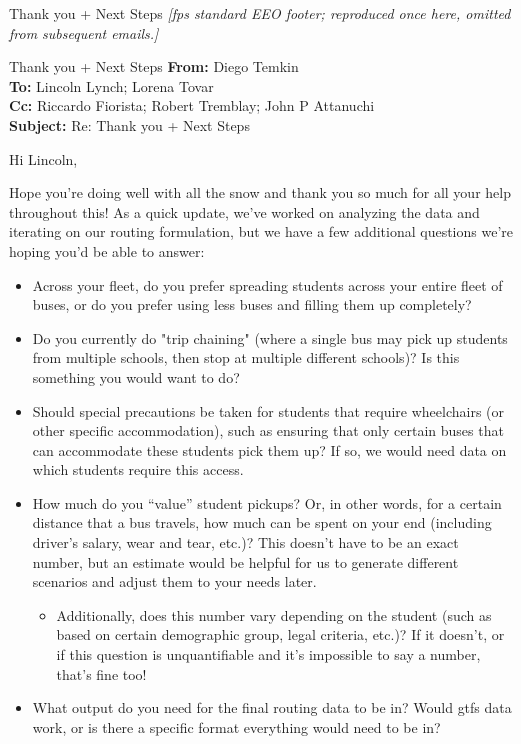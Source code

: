 {\begin{emailbox}{Thank you + Next Steps}
    \textit{[\gls{fps} standard EEO footer; reproduced once here, omitted from subsequent emails.]}
\end{emailbox}

\begin{emailbox}{Thank you + Next Steps}
    \textbf{From:} Diego Temkin \\
    \textbf{To:} Lincoln Lynch; Lorena Tovar \\
    \textbf{Cc:} Riccardo Fiorista; Robert Tremblay; John P Attanuchi \\
    \textbf{Subject:} Re: Thank you + Next Steps

    \vspace{1em}
    Hi Lincoln, \vspace{1em}

    Hope you're doing well with all the snow and thank you so much for all your help throughout this! As a quick update, we've worked on analyzing the data and iterating on our routing formulation, but we have a few additional questions we're hoping you'd be able to answer:

    \begin{itemize}
        \item Across your fleet, do you prefer spreading students across your entire fleet of buses, or do you prefer using less buses and filling them up completely?
        \item Do you currently do "trip chaining" (where a single bus may pick up students from multiple schools, then stop at multiple different schools)? Is this something you would want to do?
        \item Should special precautions be taken for students that require wheelchairs (or other specific accommodation), such as ensuring that only certain buses that can accommodate these students pick them up? If so, we would need data on which students require this access.
        \item How much do you ``value'' student pickups? Or, in other words, for a certain distance that a bus travels, how much can be spent on your end (including driver's salary, wear and tear, etc.)? This doesn't have to be an exact number, but an estimate would be helpful for us to generate different scenarios and adjust them to your needs later.
        \begin{itemize}
            \item Additionally, does this number vary depending on the student (such as based on certain demographic group, legal criteria, etc.)? If it doesn't, or if this question is unquantifiable and it's impossible to say a number, that's fine too!
        \end{itemize}
        \item What output do you need for the final routing data to be in? Would \acrshort{gtfs} data work, or is there a specific format everything would need to be in?
    \end{itemize}


\end{emailbox}}
